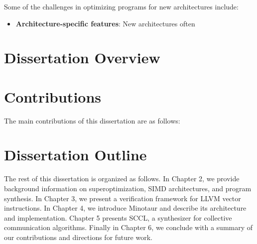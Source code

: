 Some of the challenges in optimizing programs for new architectures
include:

\begin{itemize}
\item \textbf{Architecture-specific features}: New architectures often
\end{itemize}


\section{Dissertation Overview}



\section{Contributions}

The main contributions of this dissertation are as follows:

\section{Dissertation Outline}

The rest of this dissertation is organized as follows. In Chapter 2, we
provide background information on superoptimization, SIMD architectures,
and program synthesis. In Chapter 3, we present a verification framework
for LLVM vector instructions. In Chapter 4, we introduce Minotaur and
describe its architecture and implementation. Chapter 5 presents SCCL,
a synthesizer for collective communication algorithms. Finally in Chapter
6, we conclude with a summary of our contributions and directions for
future work.





